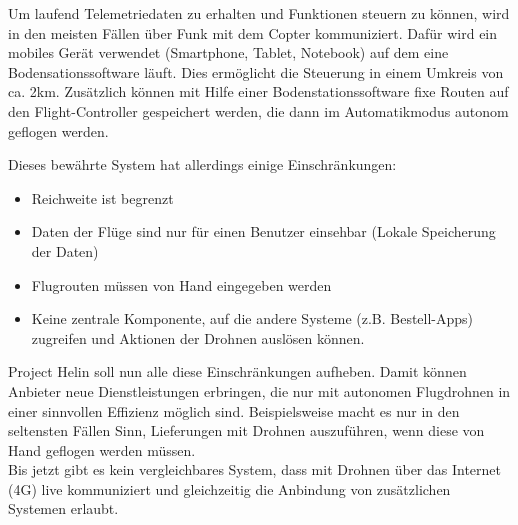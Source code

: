 Um laufend Telemetriedaten zu erhalten und Funktionen steuern zu können, wird in den meisten Fällen über Funk mit dem Copter kommuniziert. Dafür wird ein mobiles Gerät verwendet (Smartphone, Tablet, Notebook) auf dem eine Bodensationssoftware läuft. Dies ermöglicht die Steuerung in einem Umkreis von ca. 2km. Zusätzlich können mit Hilfe einer Bodenstationssoftware fixe Routen auf den \Gls{Flight-Controller} gespeichert werden, die dann im Automatikmodus autonom geflogen werden.

\newpage
Dieses bewährte System hat allerdings einige Einschränkungen: 

\begin{itemize}
	\item{Reichweite ist begrenzt}
	\item{Daten der Flüge sind nur für einen Benutzer einsehbar (Lokale Speicherung der Daten)}
	\item{Flugrouten müssen von Hand eingegeben werden}
	\item{Keine zentrale Komponente, auf die andere Systeme (z.B. Bestell-Apps) zugreifen und Aktionen der Drohnen auslösen können.}
\end{itemize}

Project Helin soll nun alle diese Einschränkungen aufheben. Damit können Anbieter neue Dienstleistungen erbringen, die nur mit autonomen Flugdrohnen in einer sinnvollen Effizienz möglich sind. Beispielsweise macht es nur in den seltensten Fällen Sinn, Lieferungen mit Drohnen auszuführen, wenn diese von Hand geflogen werden müssen. \\

Bis jetzt gibt es kein vergleichbares System, dass mit Drohnen über das Internet (4G) live kommuniziert und gleichzeitig die Anbindung von zusätzlichen Systemen erlaubt.

